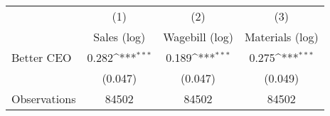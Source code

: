 {
\def\sym#1{\ifmmode^{#1}\else\(^{#1}\)\fi}
\begin{tabular}{l*{3}{c}}
\hline\hline
                    &\multicolumn{1}{c}{(1)}&\multicolumn{1}{c}{(2)}&\multicolumn{1}{c}{(3)}\\
                    &\multicolumn{1}{c}{Sales (log)}&\multicolumn{1}{c}{Wagebill (log)}&\multicolumn{1}{c}{Materials (log)}\\
\hline
Better CEO          &       0.282\sym{***}&       0.189\sym{***}&       0.275\sym{***}\\
                    &     (0.047)         &     (0.047)         &     (0.049)         \\
\hline
Observations        &       84502         &       84502         &       84502         \\
\hline\hline
\end{tabular}
}
